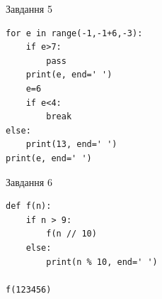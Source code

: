 \documentclass[12pt, ukrainian]{article}
\begin{document}
{\vspace{15mm}
\begin{minipage}[t]{9.7cm}                
{\begin{center}Завдання {5}\end{center}}
\begin{verbatim}
for e in range(-1,-1+6,-3):
    if e>7:
        pass
    print(e, end=' ')
    e=6
    if e<4:
        break
else:
    print(13, end=' ')
print(e, end=' ')
\end{verbatim}     
\end{minipage}
\vline \hspace{8mm}
\begin{minipage}[t]{8.0cm}                
{\begin{center}Завдання {6}\end{center}}
\begin{verbatim}
def f(n):
    if n > 9:
        f(n // 10)
    else:
        print(n % 10, end=' ')

f(123456)
\end{verbatim}     
\end{minipage}

}
\newpage
\end{document}
